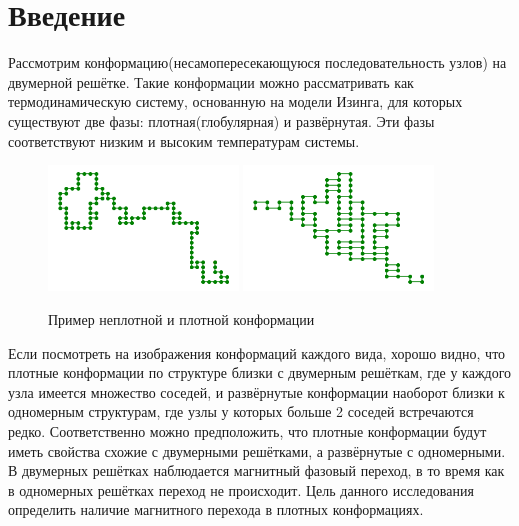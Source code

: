 \section{Введение}
Рассмотрим конформацию(несамопересекающуюся последовательность узлов) на двумерной решётке. Такие конформации можно рассматривать как термодинамическую систему, основанную на модели Изинга, для которых существуют две фазы: плотная(глобулярная) и развёрнутая. Эти фазы соответствуют низким и высоким температурам системы.

\begin{figure}[h]
	\centering
	\includegraphics[width=0.45\textwidth]{../images/loose_conf.png}
	\includegraphics[width=0.45\textwidth]{../images/dense_conf.png} 
	\caption{Пример неплотной и плотной конформации}
\end{figure}

Если посмотреть на изображения конформаций каждого вида, хорошо видно, что плотные конформации по структуре близки с двумерным решёткам, где у каждого узла имеется множество соседей, и развёрнутые конформации наоборот близки к одномерным структурам, где узлы у которых больше 2 соседей встречаются редко. Соответственно можно предположить, что плотные конформации будут иметь свойства схожие с двумерными решётками, а развёрнутые с одномерными. В двумерных решётках наблюдается магнитный фазовый переход, в то время как в одномерных решётках переход не происходит. Цель данного исследования определить наличие магнитного перехода в плотных конформациях.


